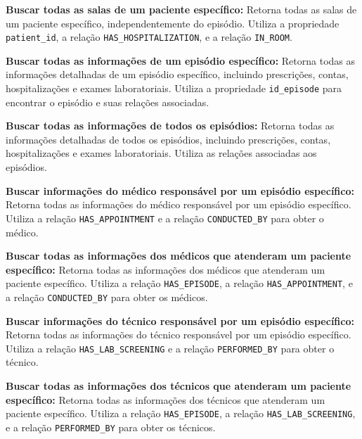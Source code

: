 \vspace{0.15cm}
\textbf{Buscar todas as salas de um paciente específico:} Retorna todas as salas de um paciente específico, independentemente do episódio. Utiliza a propriedade \texttt{patient\_id}, a relação \texttt{HAS\_HOSPITALIZATION}, e a relação \texttt{IN\_ROOM}.

\vspace{0.15cm}
\textbf{Buscar todas as informações de um episódio específico:} Retorna todas as informações detalhadas de um episódio específico, incluindo prescrições, contas, hospitalizações e exames laboratoriais. Utiliza a propriedade \texttt{id\_episode} para encontrar o episódio e suas relações associadas.

\vspace{0.15cm}
\textbf{Buscar todas as informações de todos os episódios:} Retorna todas as informações detalhadas de todos os episódios, incluindo prescrições, contas, hospitalizações e exames laboratoriais. Utiliza as relações associadas aos episódios.

\vspace{0.15cm}
\textbf{Buscar informações do médico responsável por um episódio específico:} Retorna todas as informações do médico responsável por um episódio específico. Utiliza a relação \texttt{HAS\_APPOINTMENT} e a relação \texttt{CONDUCTED\_BY} para obter o médico.

\vspace{0.15cm}
\textbf{Buscar todas as informações dos médicos que atenderam um paciente específico:} Retorna todas as informações dos médicos que atenderam um paciente específico. Utiliza a relação \texttt{HAS\_EPISODE}, a relação \texttt{HAS\_APPOINTMENT}, e a relação \texttt{CONDUCTED\_BY} para obter os médicos.

\vspace{0.15cm}
\textbf{Buscar informações do técnico responsável por um episódio específico:} Retorna todas as informações do técnico responsável por um episódio específico. Utiliza a relação \texttt{HAS\_LAB\_SCREENING} e a relação \texttt{PERFORMED\_BY} para obter o técnico.

\vspace{0.15cm}
\textbf{Buscar todas as informações dos técnicos que atenderam um paciente específico:} Retorna todas as informações dos técnicos que atenderam um paciente específico. Utiliza a relação \texttt{HAS\_EPISODE}, a relação \texttt{HAS\_LAB\_SCREENING}, e a relação \texttt{PERFORMED\_BY} para obter os técnicos.

